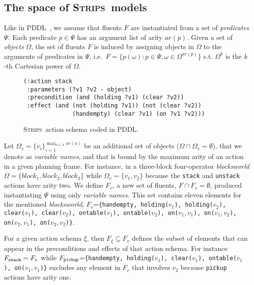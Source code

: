\documentclass[letterpaper]{article} %
\newcommand{\strips}{\textsc{Strips}}     %
\begin{document}
\subsection{The space of \strips\ models}
Like in PDDL~\cite{mcdermott1998pddl,fox2003pddl2}, we assume that fluents $F$ are instantiated from a set of {\em predicates} $\Psi$. Each predicate $p\in\Psi$ has an argument list of arity $ar(p)$. Given a set of {\em objects} $\Omega$, the set of fluents $F$ is induced by assigning objects in $\Omega$ to the arguments of predicates in $\Psi$, i.e.~$F=\{p(\omega):p\in\Psi,\omega\in\Omega^{ar(p)}\}$ s.t. $\Omega^k$ is the $k$-th Cartesian power of $\Omega$. 
\begin{figure}
\begin{scriptsize}
\begin{verbatim}
(:action stack
 :parameters (?v1 ?v2 - object)
 :precondition (and (holding ?v1) (clear ?v2))
 :effect (and (not (holding ?v1)) (not (clear ?v2))
              (handempty) (clear ?v1) (on ?v1 ?v2)))
\end{verbatim}
\end{scriptsize}
 \caption{\small \strips\ action schema coded in PDDL.}
\label{fig:stack}
\end{figure}

Let $\Omega_v=\{v_i\}_{i=1}^{\operatorname*{max}_{a\in A} ar(a)}$ be an additional set of objects ($\Omega\cap\Omega_v=\emptyset$), that we denote as {\em variable names}, and that is bound by the maximum arity of an action in a given planning frame. For instance, in a three-block four-operator {\em blocksworld} $\Omega=\{block_1, block_2, block_3\}$ while $\Omega_v=\{v_1, v_2\}$ because the {\small\tt stack} and {\small\tt unstack} actions have arity two. We define $F_v$, a new set of fluents, $F\cap F_v=\emptyset$, produced instantiating $\Psi$ using only {\em variable names}. This set contains eleven elements for the mentioned {\em blocksworld}, $F_v$={\small\tt\{handempty, holding($v_1$), holding($v_2$), clear($v_1$), clear($v_2$), ontable($v_1$), ontable($v_2$), on($v_1,v_1$), on($v_1,v_2$), on($v_2,v_1$), on($v_2,v_2$)\}}.

For a given action schema $\xi$, then $F_{\xi}\subseteq F_v$ defines the subset of elements that can appear in the preconditions and effects of that action schema. For instance $F_{\tt stack}=F_v$ while $F_{\tt pickup}$={\small\tt\{handempty, holding($v_1$), clear($v_1$), ontable($v_1$), on($v_1,v_1$)\}} excludes any element in $F_v$ that involves $v_2$ because {\small\tt pickup} actions have arity one. 
\end{document}
